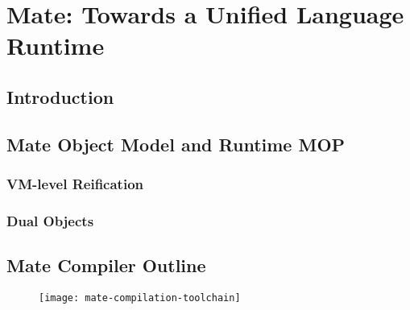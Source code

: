 

\chapter{Mate: Towards a Unified Language Runtime}
\minitoc


\section{Introduction}


\section{Mate Object Model and Runtime MOP}

\subsection{VM-level Reification}


\subsection{Dual Objects}



\section{Mate Compiler Outline}

\begin{figure}[H]
\centering
	\texttt{[image: mate-compilation-toolchain]}
\end{figure}

